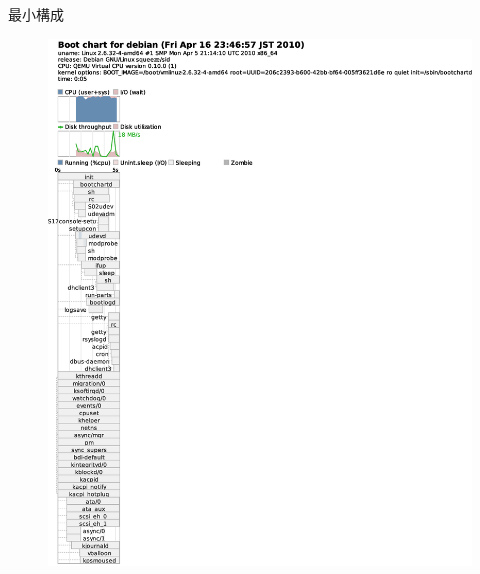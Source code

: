 \begin{frame}{最小構成}
\begin{minipage}[t]{0.48\hsize}
\begin{figure}[h]
\begin{center}
\includegraphics[width=1.0\hsize]{image201004/upstart/upstart-bootchart.eps}
\end{center}
\end{figure}
\end{minipage}
\end{frame}

